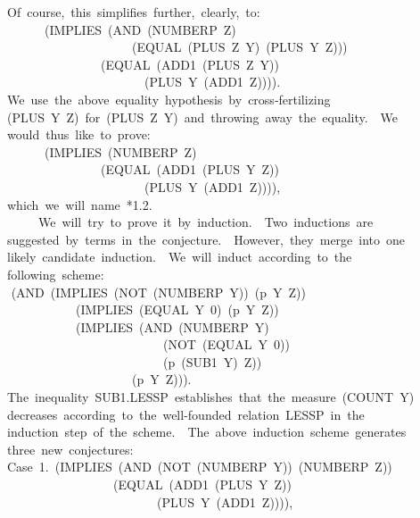 \documentclass[10pt]{book}
\newenvironment{pubasis}{\begin{flushleft}}{\end{flushleft}}
\begin{document}
\begin{pubasis}
~~Of~course,~this~simplifies~further,~clearly,~to:\\

~~~~~~~~(IMPLIES~(AND~(NUMBERP~Z)\\
~~~~~~~~~~~~~~~~~~~~~~(EQUAL~(PLUS~Z~Y)~(PLUS~Y~Z)))\\
~~~~~~~~~~~~~~~~~(EQUAL~(ADD1~(PLUS~Z~Y))\\
~~~~~~~~~~~~~~~~~~~~~~~~(PLUS~Y~(ADD1~Z)))).\\

~~We~use~the~above~equality~hypothesis~by~cross-fertilizing\\
~~(PLUS~Y~Z)~for~(PLUS~Z~Y)~and~throwing~away~the~equality.~~We\\
~~would~thus~like~to~prove:\\

~~~~~~~~(IMPLIES~(NUMBERP~Z)\\
~~~~~~~~~~~~~~~~~(EQUAL~(ADD1~(PLUS~Y~Z))\\
~~~~~~~~~~~~~~~~~~~~~~~~(PLUS~Y~(ADD1~Z)))),\\

~~which~we~will~name~*1.2.\\

~~~~~~~We~will~try~to~prove~it~by~induction.~~Two~inductions~are\\
~~suggested~by~terms~in~the~conjecture.~~However,~they~merge~into~one\\
~~likely~candidate~induction.~~We~will~induct~according~to~the\\
~~following~scheme:\\
~~	(AND~(IMPLIES~(NOT~(NUMBERP~Y))~(p~Y~Z))\\
~~~~~~~~~~~~~(IMPLIES~(EQUAL~Y~0)~(p~Y~Z))\\
~~~~~~~~~~~~~(IMPLIES~(AND~(NUMBERP~Y)\\
~~~~~~~~~~~~~~~~~~~~~~~~~~~(NOT~(EQUAL~Y~0))\\
~~~~~~~~~~~~~~~~~~~~~~~~~~~(p~(SUB1~Y)~Z))\\
~~~~~~~~~~~~~~~~~~~~~~(p~Y~Z))).\\
~~The~inequality~SUB1.LESSP~establishes~that~the~measure~(COUNT~Y)\\
~~decreases~according~to~the~well-founded~relation~LESSP~in~the\\
~~induction~step~of~the~scheme.~~The~above~induction~scheme~generates\\
~~three~new~conjectures:\\

~~Case~1.~(IMPLIES~(AND~(NOT~(NUMBERP~Y))~(NUMBERP~Z))\\
~~~~~~~~~~~~~~~~~~~(EQUAL~(ADD1~(PLUS~Y~Z))\\
~~~~~~~~~~~~~~~~~~~~~~~~~~(PLUS~Y~(ADD1~Z)))),\\


\end{pubasis}
\end{document}
